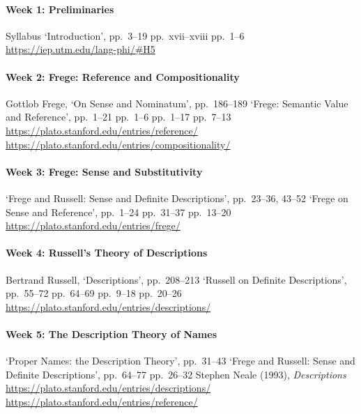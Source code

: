 \paragraph{Week 1: Preliminaries}
\begin{readings}
  \req Syllabus
  \req `Introduction', pp.\ 3--19
  \supp pp.\ xvii--xviii
  \supp pp.\ 1--6
  \supp \url{https://iep.utm.edu/lang-phi/#H5}
\end{readings}

\paragraph{Week 2: Frege: Reference and Compositionality}
\begin{readings}
  \req Gottlob Frege, `On Sense and Nominatum', pp.\ 186--189
  \req `Frege: Semantic Value and Reference', pp.\ 1--21
  \supp pp.\ 1--6
  \supp pp.\ 1--17
  \supp pp.\ 7--13
  \supp \url{https://plato.stanford.edu/entries/reference/}
  \supp \url{https://plato.stanford.edu/entries/compositionality/}
\end{readings}

\paragraph{Week 3: Frege: Sense and Substitutivity}
\begin{readings}
  \req `Frege and Russell: Sense and Definite Descriptions', pp.\ 23--36, 43--52
  \req `Frege on Sense and Reference', pp.\ 1--24
  \supp pp.\ 31--37
  \supp pp.\ 13--20
  \supp \url{https://plato.stanford.edu/entries/frege/}
\end{readings}

\paragraph{Week 4: Russell's Theory of Descriptions}
\begin{readings}
  \req Bertrand Russell, `Descriptions', pp.\ 208--213
  \req `Russell on Definite Descriptions', pp.\ 55--72
  \supp pp.\ 64--69
  \supp pp.\ 9--18
  \supp pp.\ 20--26
  \supp \url{https://plato.stanford.edu/entries/descriptions/}
\end{readings}

\paragraph{Week 5: The Description Theory of Names}
\begin{readings}
  \req `Proper Names: the Description Theory', pp.\ 31--43
  \req `Frege and Russell: Sense and Definite Descriptions', pp.\ 64--77
  \supp pp.\ 26--32
  \supp Stephen Neale (1993), \emph{Descriptions}
  \supp \url{https://plato.stanford.edu/entries/descriptions/}
  \supp \url{https://plato.stanford.edu/entries/reference/}
\end{readings}

